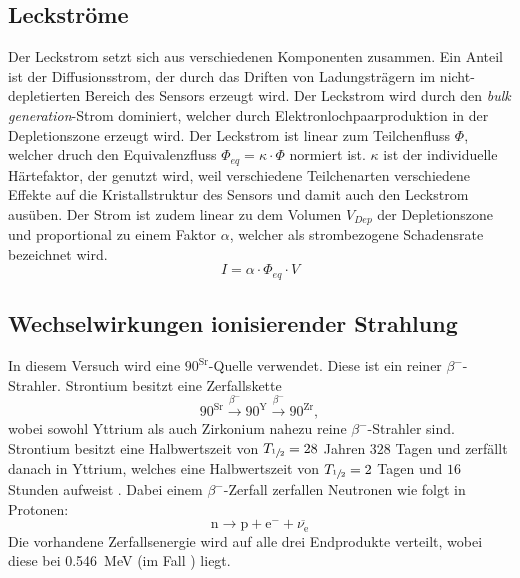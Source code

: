 \subsection{Leckströme}
Der Leckstrom setzt sich aus verschiedenen Komponenten zusammen. Ein Anteil ist der Diffusionsstrom, der durch das Driften von Ladungsträgern im nicht-depletierten Bereich des Sensors erzeugt wird. Der Leckstrom wird durch den \textit{bulk generation}-Strom dominiert, welcher durch Elektronlochpaarproduktion in der Depletionszone erzeugt wird. Der Leckstrom ist linear zum Teilchenfluss $\Phi$, welcher druch den Equivalenzfluss $\Phi_{eq} = \kappa \cdot \Phi$ normiert ist. $\kappa$ ist der individuelle Härtefaktor, der genutzt wird, weil verschiedene Teilchenarten verschiedene Effekte auf die Kristallstruktur des Sensors und damit auch den Leckstrom ausüben.  Der Strom ist zudem linear zu dem Volumen $V_{Dep}$ der Depletionszone und proportional zu einem Faktor $\alpha$, welcher als strombezogene Schadensrate bezeichnet wird.
\begin{equation}
	I = \alpha \cdot \Phi_{eq} \cdot V
\end{equation}

\subsection{Wechselwirkungen ionisierender Strahlung}
In diesem Versuch wird eine ${90}^\text{Sr}$-Quelle verwendet. Diese ist ein reiner $\beta^{-}$-Strahler. Strontium besitzt eine Zerfallskette
\begin{equation*}
  {90}^\text{Sr} \stackrel{\beta^{-}}{\longrightarrow} {90}^\text{Y}
  \stackrel{\beta^{-}}{\longrightarrow} {90}^\text{Zr},
\end{equation*}
wobei sowohl Yttrium als auch Zirkonium nahezu reine $\beta^{-}$-Strahler sind. Strontium besitzt eine Halbwertszeit von $T_{\sfrac{1}{2}} = 28$ Jahren $328$ Tagen und zerfällt danach in Yttrium, welches eine Halbwertszeit von $T_{\sfrac{1}{2}} = 2$ Tagen und $16$ Stunden aufweist \cite{periodensystem}. Dabei einem $\beta^{-}$-Zerfall zerfallen Neutronen wie folgt in Protonen:
\begin{equation*}
  \text{n} \rightarrow \text{p} + \text{e}^{-} + \overline{\nu_\text{e}}
\end{equation*}
Die vorhandene Zerfallsenergie wird auf alle drei Endprodukte verteilt, wobei diese bei \SI{0.546}{\mega\electronvolt} (im Fall ) liegt.

